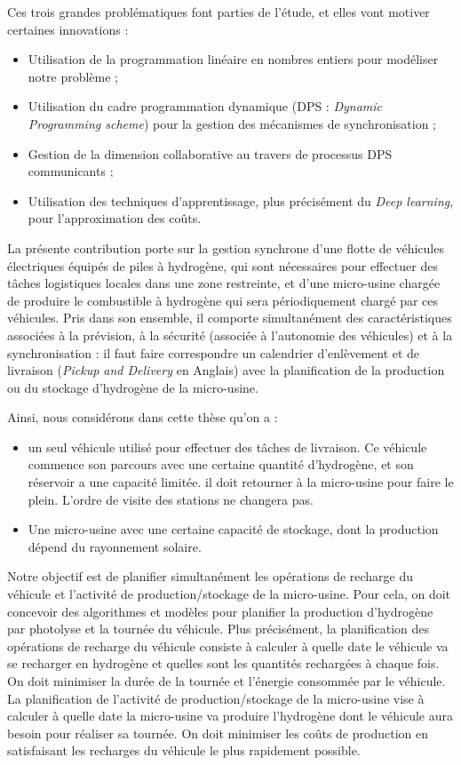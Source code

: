 Ces trois grandes problématiques font parties de l'étude, et elles vont motiver certaines innovations : 
\begin{itemize}[label=$\square$]
	\item Utilisation de la programmation linéaire en nombres entiers pour modéliser notre problème ;
	\item Utilisation du cadre programmation dynamique (DPS : \textit{Dynamic Programming scheme}) pour la gestion des mécanismes de synchronisation ;
	\item Gestion de la dimension collaborative au travers de processus DPS communicants ;
	\item Utilisation des techniques d'apprentissage, plus précisément du \textit{Deep learning}, pour l'approximation des coûts.
\end{itemize} 

La présente contribution porte sur la gestion synchrone  d'une flotte de véhicules électriques équipés de piles à hydrogène, qui sont nécessaires pour effectuer des tâches logistiques locales dans une zone restreinte, et d'une micro-usine chargée de produire le combustible à hydrogène qui sera périodiquement chargé par ces véhicules. Pris dans son ensemble, il comporte simultanément des caractéristiques associées à la prévision, à la sécurité (associée à l'autonomie des véhicules) et à la synchronisation : il faut faire correspondre un calendrier d'enlèvement et de livraison (\textit{Pickup and Delivery} en Anglais) avec la planification de la production ou du stockage d'hydrogène de la micro-usine.

 Ainsi, nous considérons dans cette thèse qu'on a : 
 \begin{itemize}[label=$\square$]
 \item  un seul véhicule utilisé pour effectuer des tâches de livraison. 
 Ce véhicule commence son parcours avec une certaine quantité d'hydrogène, et son réservoir a une capacité limitée. il doit retourner à la micro-usine pour faire le plein. L'ordre de visite des stations ne changera pas.
  
 \item Une micro-usine avec une certaine capacité de stockage, dont la production dépend du rayonnement solaire. 
\end{itemize}
 Notre objectif est de planifier simultanément les opérations de recharge du véhicule et l'activité de production/stockage de la micro-usine.
Pour cela, on doit concevoir des algorithmes et modèles pour planifier la production d'hydrogène par photolyse et la tournée du véhicule. Plus précisément, la planification des opérations de recharge du véhicule consiste à calculer à quelle date le véhicule va se recharger en hydrogène et quelles sont les quantités rechargées à chaque fois. On doit minimiser la durée de la tournée et l'énergie consommée par le véhicule. La planification de l'activité de production/stockage de la micro-usine vise à calculer à quelle date la micro-usine va produire l'hydrogène dont le véhicule aura besoin pour réaliser sa tournée. On doit minimiser les coûts de production en satisfaisant les recharges du véhicule le plus rapidement possible. 

